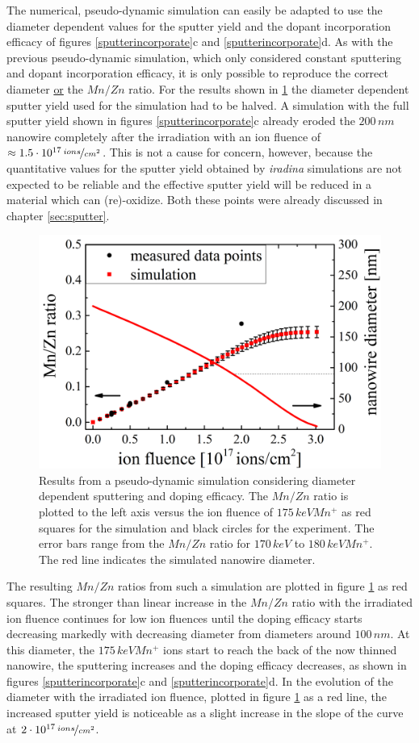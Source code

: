 The numerical, pseudo-dynamic simulation can easily be adapted to use the diameter dependent values for the sputter yield and the dopant incorporation efficacy of figures \ref{sputterincorporate}c and \ref{sputterincorporate}d. As with the previous pseudo-dynamic simulation, which only considered constant sputtering and dopant incorporation efficacy, it is only possible to reproduce the correct diameter \underline{or} the $Mn/Zn$ ratio. For the results shown in \ref{pseudodynamic} the diameter dependent sputter yield used for the simulation had to be halved. A simulation with the full sputter yield shown in figures \ref{sputterincorporate}c already eroded the $200\,nm$ nanowire completely after the irradiation with an ion fluence of $\approx 1.5\cdot 10^{17}\,\nicefrac{ions}{cm^2}$. This is not a cause for concern, however, because the quantitative values for the sputter yield obtained by \emph{iradina} simulations are not expected to be reliable and the effective sputter yield will be reduced in a material which can (re)-oxidize. Both these points were already discussed in chapter \ref{sec:sputter}.

\begin{figure}
	\centering
		\includegraphics[width=.5\textwidth]{images/pseudodynamic.png}
	\caption{Results from a pseudo-dynamic simulation considering diameter dependent sputtering and doping efficacy. The $Mn/Zn$ ratio is plotted to the left axis versus the ion fluence of $175\,keV Mn^+$ as red squares for the simulation and black circles for the experiment. The error bars range from the $Mn/Zn$ ratio for $170\,keV$ to $180\,keV Mn^+$. The red line indicates the simulated nanowire diameter.}
	\label{pseudodynamic}
\end{figure} 

The resulting $Mn/Zn$ ratios from such a simulation are plotted in figure \ref{pseudodynamic} as red squares. The stronger than linear increase in the $Mn/Zn$ ratio with the irradiated ion fluence continues for low ion fluences until the doping efficacy starts decreasing markedly with decreasing diameter from diameters around $100\,nm$. At this diameter, the $175\,keV Mn^+$ ions start to reach the back of the now thinned nanowire, the sputtering increases and the doping efficacy decreases, as shown in figures \ref{sputterincorporate}c and \ref{sputterincorporate}d. In the evolution of the diameter with the irradiated ion fluence, plotted in figure \ref{pseudodynamic} as a red line, the increased sputter yield is noticeable as a slight increase in the slope of the curve at $2\cdot 10^{17}\,\nicefrac{ions}{cm^2}$. 

